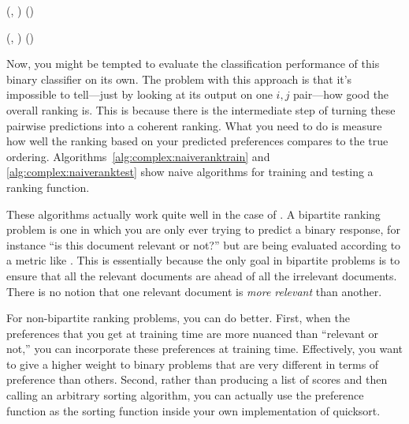   {(, )}
  {
\ENDIF
\ENDFOR
\ENDFOR
\RETURN {}()
}

  {(, \VAR{$\hat\vx$})}
  {
\ENDFOR
\RETURN {}()
}

Now, you might be tempted to evaluate the classification performance
of this binary classifier on its own.  The problem with this approach
is that it's impossible to tell---just by looking at its output on one
$i,j$ pair---how good the overall ranking is.  This is because there
is the intermediate step of turning these pairwise predictions into a
coherent ranking.  What you need to do is measure how well the ranking
based on your predicted preferences compares to the true ordering.
Algorithms~\ref{alg:complex:naiveranktrain} and
\ref{alg:complex:naiveranktest} show naive algorithms for training and
testing a ranking function.

These algorithms actually work quite well in the case of
.  A bipartite ranking problem is
one in which you are only ever trying to predict a binary response,
for instance ``is this document relevant or not?'' but are being
evaluated according to a metric like .  This is
essentially because the only goal in bipartite problems is to ensure
that all the relevant documents are ahead of all the irrelevant
documents.  There is no notion that one relevant document is
\emph{more relevant} than another.

For non-bipartite ranking problems, you can do better.  First, when
the preferences that you get at training time are more nuanced than
``relevant or not,'' you can incorporate these preferences at training
time.  Effectively, you want to give a higher weight to binary
problems that are very different in terms of preference than others.
Second, rather than producing a list of scores and then calling an
arbitrary sorting algorithm, you can actually use the preference
function as the sorting function inside your own implementation of
quicksort.

